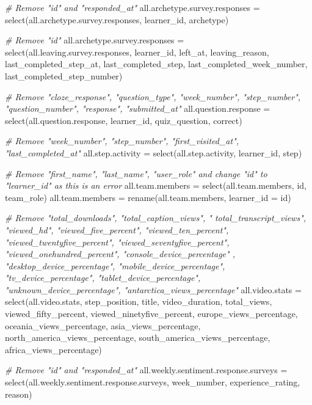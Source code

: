 \documentclass[
]{article}
\newenvironment{Shaded}{\begin{snugshade}}{\end{snugshade}}
\newcommand{\AttributeTok}[1]{\textcolor[rgb]{0.77,0.63,0.00}{#1}}
\newcommand{\CommentTok}[1]{\textcolor[rgb]{0.56,0.35,0.01}{\textit{#1}}}
\newcommand{\FunctionTok}[1]{\textcolor[rgb]{0.00,0.00,0.00}{#1}}
\newcommand{\NormalTok}[1]{#1}
\newcommand{\OtherTok}[1]{\textcolor[rgb]{0.56,0.35,0.01}{#1}}
\begin{document}
\begin{Shaded}
\begin{Highlighting}[]
\CommentTok{\# Remove "id" and "responded\_at"}
\NormalTok{all.archetype.survey.responses }\OtherTok{=} \FunctionTok{select}\NormalTok{(all.archetype.survey.responses, learner\_id, archetype)}

\CommentTok{\# Remove "id"}
\NormalTok{all.archetype.survey.responses }\OtherTok{=} \FunctionTok{select}\NormalTok{(all.leaving.survey.responses, learner\_id, left\_at,  leaving\_reason, last\_completed\_step\_at, last\_completed\_step,    last\_completed\_week\_number, last\_completed\_step\_number)}

\CommentTok{\# Remove "cloze\_response", "question\_type", "week\_number",  "step\_number",  "question\_number",  "response", "submitted\_at"}
\NormalTok{all.question.response }\OtherTok{=} \FunctionTok{select}\NormalTok{(all.question.response, learner\_id,   quiz\_question, correct)}

\CommentTok{\# Remove "week\_number", "step\_number", "first\_visited\_at", "last\_completed\_at"}
\NormalTok{all.step.activity }\OtherTok{=} \FunctionTok{select}\NormalTok{(all.step.activity, learner\_id,   step)}

\CommentTok{\# Remove "first\_name", "last\_name", "user\_role" and change "id" to "learner\_id" as this is an error}
\NormalTok{all.team.members }\OtherTok{=} \FunctionTok{select}\NormalTok{(all.team.members, id, team\_role)}
\NormalTok{all.team.members }\OtherTok{=} \FunctionTok{rename}\NormalTok{(all.team.members, }\AttributeTok{learner\_id =}\NormalTok{ id)}

\CommentTok{\# Remove "total\_downloads", "total\_caption\_views", "    total\_transcript\_views", "viewed\_hd", "viewed\_five\_percent", "viewed\_ten\_percent", "viewed\_twentyfive\_percent", "viewed\_seventyfive\_percent", "viewed\_onehundred\_percent", "console\_device\_percentage" , "desktop\_device\_percentage", "mobile\_device\_percentage", "tv\_device\_percentage", "tablet\_device\_percentage", "unknown\_device\_percentage", "antarctica\_views\_percentage"}
\NormalTok{all.video.stats }\OtherTok{=} \FunctionTok{select}\NormalTok{(all.video.stats, step\_position,    title,  video\_duration, total\_views,    viewed\_fifty\_percent,   viewed\_ninetyfive\_percent,              europe\_views\_percentage,    oceania\_views\_percentage,   asia\_views\_percentage,  north\_america\_views\_percentage, south\_america\_views\_percentage, africa\_views\_percentage)}

\CommentTok{\# Remove "id" and "responded\_at"}
\NormalTok{all.weekly.sentiment.response.surveys }\OtherTok{=} \FunctionTok{select}\NormalTok{(all.weekly.sentiment.response.surveys, week\_number,  experience\_rating,  reason)}
\end{Highlighting}
\end{Shaded}
\end{document}
